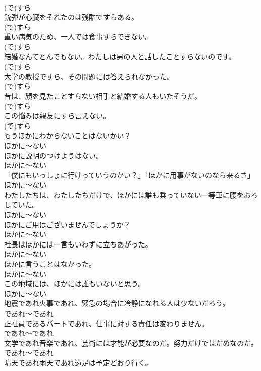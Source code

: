 \documentclass[8pt]{extreport}
\begin{document}
\begin{CJK}{UTF8}{min}
\\	(で)すら
\\	銃弾が心臓をそれたのは残酷ですらある。	
\\	(で)すら
\\	重い病気のため、一人では食事すらできない。	
\\	(で)すら
\\	結婚なんてとんでもない。わたしは男の人と話したことすらないのです。	
\\	(で)すら
\\	大学の教授ですら、その問題には答えられなかった。	
\\	(で)すら
\\	昔は、顔を見たことすらない相手と結婚する人もいたそうだ。	
\\	(で)すら
\\	この悩みは親友にすら言えない。	
\\	(で)すら
\\	もうほかにわからないことはないかい？	
\\	ほかに～ない
\\	ほかに説明のつけようはない。	
\\	ほかに～ない
\\	「僕にもいっしょに行けっていうのかい？」「ほかに用事がないのなら来るさ」	
\\	ほかに～ない
\\	わたしたちは、わたしたちだけで、ほかには誰も乗っていない一等車に腰をおろしていた。	
\\	ほかに～ない
\\	ほかにご用はございませんでしょうか？	
\\	ほかに～ない
\\	社長はほかには一言もいわずに立ちあがった。	
\\	ほかに～ない
\\	ほかに言うことはなかった。	
\\	ほかに～ない
\\	この地域には、ほかには誰もいないと思う。	
\\	ほかに～ない
\\	地震であれ火事であれ、緊急の場合に冷静になれる人は少ないだろう。	
\\	であれ～であれ
\\	正社員であるパートであれ、仕事に対する責任は変わりません。	
\\	であれ～であれ
\\	文学であれ音楽であれ、芸術には才能が必要なのだ。努力だけではだめなのだ。	
\\	であれ～であれ
\\	晴天であれ雨天であれ遠足は予定どおり行く。	

\end{CJK}
\end{document}
